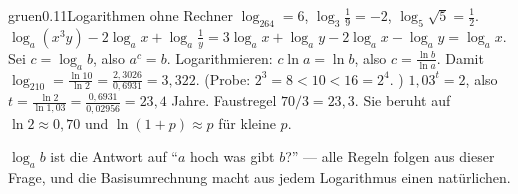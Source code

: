 \begin{loesungkarte}{gruen}{0.11}{Logarithmen ohne Rechner}
$\log_264 = 6$, $\log_3\frac19 = -2$, $\log_5\sqrt5 = \frac12$.
$\log_a(x^{3}y) - 2\log_ax + \log_a\frac1y = 3\log_ax + \log_ay - 2\log_ax - \log_ay = \log_ax$.
Sei $c = \log_ab$, also $a^{c} = b$. Logarithmieren: $c\ln a = \ln b$, also $c = \frac{\ln b}{\ln a}$. Damit $\log_210 = \frac{\ln10}{\ln2} = \frac{2{,}3026}{0{,}6931} = 3{,}322$. (Probe: $2^{3} = 8 < 10 < 16 = 2^{4}$. \checkmark)
$1{,}03^{t} = 2$, also $t = \frac{\ln2}{\ln1{,}03} = \frac{0{,}6931}{0{,}02956} = 23{,}4$ Jahre. Faustregel $70/3 = 23{,}3$. Sie beruht auf $\ln2\approx0{,}70$ und $\ln(1 + p)\approx p$ für kleine $p$.
\begin{mitnehmen}\kastentext
$\log_ab$ ist die Antwort auf \enquote{$a$ hoch was gibt $b$?} --- alle Regeln folgen aus dieser Frage, und die Basisumrechnung macht aus jedem Logarithmus einen natürlichen.
\end{mitnehmen}
\end{loesungkarte}

